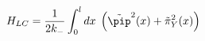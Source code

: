 \begin{equation}
\label{eq:FT continuum Hamiltonian 2}
    H_{LC} = \frac{1}{2k_-} \int_0^l dx\;
    \left( \tilde\pip^2 (x) + \tilde\pi_Y^2(x) \right)
\end{equation}

